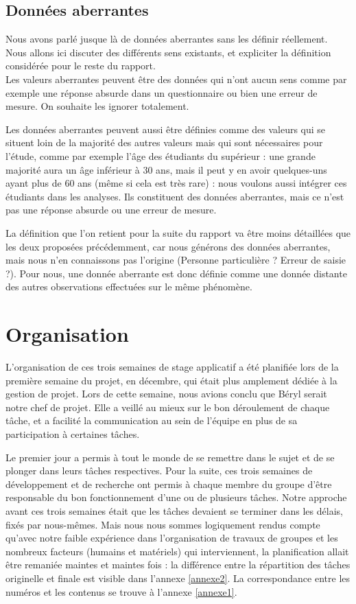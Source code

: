 \documentclass[a4paper,12pt]{article} %
\begin{document}
		\subsection{Données aberrantes}
		    Nous avons parlé jusque là de données aberrantes sans les définir réellement. Nous allons ici discuter des différents sens existants, et expliciter la définition considérée pour le reste du rapport.\\
		    
		    Les valeurs aberrantes peuvent être des données qui n'ont aucun sens comme par exemple une réponse absurde dans un questionnaire ou bien une erreur de mesure. On souhaite les ignorer totalement. 
		    
		    Les données aberrantes peuvent aussi être définies comme des valeurs qui se situent loin de la majorité des autres valeurs mais qui sont nécessaires pour l'étude, comme par exemple l'âge des étudiants du supérieur : une grande majorité aura un âge inférieur à 30 ans, mais il peut y en avoir quelques-uns ayant plus de 60 ans (même si cela est très rare) : nous voulons aussi intégrer ces étudiants dans les analyses. Ils constituent des données aberrantes, mais ce n'est pas une réponse absurde ou une erreur de mesure.
		    
		    La définition que l'on retient pour la suite du rapport va être moins détaillées que les deux proposées précédemment, car nous générons des données aberrantes, mais nous n'en connaissons pas l'origine (Personne particulière ? Erreur de saisie ?). Pour nous, une donnée aberrante est donc définie comme une donnée distante des autres observations effectuées sur le même phénomène.
		    
		    
	\section{\label{orga}Organisation}
	    L'organisation de ces trois semaines de stage applicatif a été planifiée lors de la première semaine du projet, en décembre, qui était plus amplement dédiée à la gestion de projet.
        Lors de cette semaine, nous avions conclu que Béryl serait notre chef de projet. Elle a veillé au mieux sur le bon déroulement de chaque tâche, et a facilité la communication au sein de l'équipe en plus de sa participation à certaines tâches.
    
        Le premier jour a permis à tout le monde de se remettre dans le sujet et de se plonger dans leurs tâches respectives. Pour la suite, ces trois semaines de développement et de recherche ont permis à chaque membre du groupe d'être responsable du bon fonctionnement d'une ou de plusieurs tâches. Notre approche avant ces trois semaines était que les tâches devaient se terminer dans les délais, fixés par nous-mêmes.
        Mais nous nous sommes logiquement rendus compte qu'avec notre faible expérience dans l'organisation de travaux de groupes et les nombreux facteurs (humains et matériels) qui interviennent, la planification allait être remaniée maintes et maintes fois : la différence entre la répartition des tâches originelle et finale est visible dans l'annexe \ref{annexe2}. La correspondance entre les numéros et les contenus se trouve à l'annexe \ref{annexe1}.
        
\end{document}

